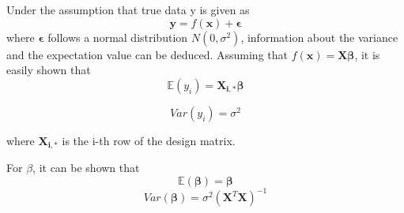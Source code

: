 \documentclass[11pt,a4paper,titlepage]{article}
\begin{document}
Under the assumption that true data y is given as
\begin{equation*}
\bm{y}=f(\bm{x})+\bm{\epsilon}
\end{equation*}
where $\bm{\epsilon}$ follows a normal distribution $N(0,\sigma^2)$, information about the variance and the expectation value can be deduced. Assuming that $f(\bm{x})=\bm{X\beta}$, it is easily shown that
\begin{equation*}
\mathbb{E}(y_i)=\bm{X_{i,*}\beta}
\end{equation*}

\begin{equation*}
Var(y_i)=\sigma^2
\end{equation*}

where $\bm{X_{i,*}}$ is the i-th row of the design matrix.

For $\beta$, it can be shown that \citep{HW2}
\begin{equation*}
\mathbb{E}(\bm{\beta})=\bm{\beta}
\end{equation*}
\begin{equation*}
Var(\bm{\beta})=\sigma^2(\bm{X}^T\bm{X})^{-1}
\end{equation*}
\end{document}
